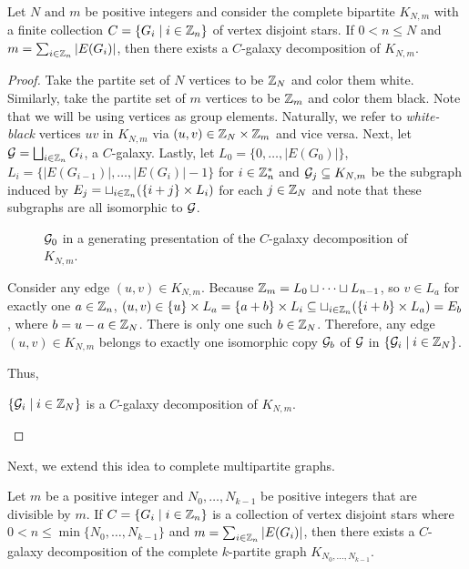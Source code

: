 \begin{thm}\label{thm:galdecomp}
Let $N\text{ and }m$ be positive integers and consider the complete bipartite $K_{N,m}$ with a finite collection $C=\{G_{i}\mid i\in \mathbb{Z}_{n}\}$ of vertex disjoint stars. If $0<n\leq N$ and $m=\sum_{i\in \mathbb{Z}_{n}}|E(G_{i})|$, then there exists a $C$-galaxy decomposition of $K_{N,m}$.
\end{thm}
\begin{proof}
  Take the partite set of $N$ vertices to be $\mathbb{Z}_{N}$ and color them white. Similarly, take the partite set of $m$ vertices to be $\mathbb{Z}_{m}$ and color them black. Note that we will be using vertices as group elements. Naturally, we refer to \textit{white-black} vertices $uv$ in $K_{N,m}$ via $(u,v)\in \mathbb{Z}_{N}\times \mathbb{Z}_{m}$ and vice versa. Next, let $\mathcal{G}=\bigsqcup_{i\in \mathbb{Z}_{n}}G_{i}$, a $C$-galaxy. Lastly, let $L_{0}=\{0,\hdots,|E(G_{0})|\}$, $L_{i}=\{|E(G_{i-1})|,\hdots,|E(G_{i})|-1\}$ for $i\in \mathbb{Z}^{*}_{n}$ and $\mathcal{G}_{j}\subseteq K_{N,m}$ be the subgraph induced by $E_{j}=\sqcup_{i\in \mathbb{Z}_{n}} (\{i+j\}\times L_{i})$ for each $j\in \mathbb{Z}_{N}$ and note that these subgraphs are all isomorphic to $\mathcal{G}$.
\begin{figure}[H]
    \centering
    
    \caption{$\mathcal{G}_{0}$ in a generating presentation of the $C$-galaxy decomposition of $K_{N,m}$.}
    \label{fig:galdecomp}
\end{figure}
\noindent Consider any edge $(u,v)\in K_{N,m}$. Because $\mathbb{Z}_{m}=L_{0}\sqcup \cdots \sqcup L_{n-1}$, so $v\in L_{a}$ for exactly one $a\in \mathbb{Z}_{n}$, $(u,v)\in \{u\}\times L_{a}=\{a+b\}\times L_{i}\subseteq \sqcup_{i\in \mathbb{Z}_{n}} (\{i+b\}\times L_{a})=E_{b}$, where $b=u-a\in \mathbb{Z}_{N}$. There is only one such $b\in \mathbb{Z}_{N}$. Therefore, any edge $(u,v)\in K_{N,m}$ belongs to exactly one isomorphic copy $\mathcal{G}_{b}$ of $\mathcal{G}$ in $\{\mathcal{G}_{i}\mid i\in \mathbb{Z}_{N}\}$.\newline

\noindent Thus,
\begin{center}
$\{\mathcal{G}_{i}\mid i\in \mathbb{Z}_{N}\}$ is a $C$-galaxy decomposition of $K_{N,m}$.
\end{center}
  
\end{proof}
Next, we extend this idea to complete multipartite graphs.
\begin{corollary}
Let $m$ be a positive integer and $N_{0},\hdots,N_{k-1}$ be positive integers that are divisible by $m$. If $C=\{G_{i}\mid i\in \mathbb{Z}_{n}\}$ is a collection of vertex disjoint stars where $0<n\leq \min\{N_{0},\hdots,N_{k-1}\}$ and $m=\sum_{i\in \mathbb{Z}_{n}} |E(G_{i})|$, then there exists a $C$-galaxy decomposition of the complete $k$-partite graph $K_{N_{0},\hdots,N_{k-1}}$.
\end{corollary}
